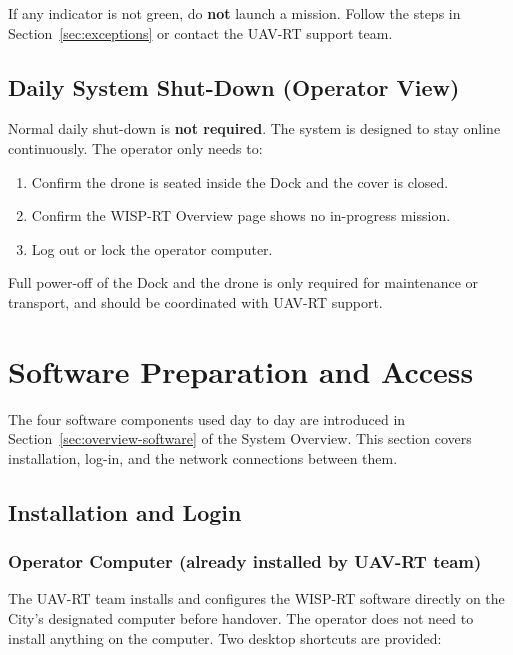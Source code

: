 \documentclass[11pt,letterpaper]{article}
\begin{document}
If any indicator is not green, do \textbf{not} launch a mission. Follow the
steps in Section~\ref{sec:exceptions} or contact the UAV-RT support team.

\subsection{Daily System Shut-Down (Operator View)}

Normal daily shut-down is \textbf{not required}. The system is designed to
stay online continuously. The operator only needs to:

\begin{enumerate}[leftmargin=1.5em]
  \item Confirm the drone is seated inside the Dock and the cover is closed.
  \item Confirm the WISP-RT Overview page shows no in-progress mission.
  \item Log out or lock the operator computer.
\end{enumerate}

Full power-off of the Dock and the drone is only required for maintenance
or transport, and should be coordinated with UAV-RT support.

\newpage
\section{Software Preparation and Access}

The four software components used day to day are introduced in
Section~\ref{sec:overview-software} of the System Overview. This section
covers installation, log-in, and the network connections between them.

\subsection{Installation and Login}

\subsubsection{Operator Computer (already installed by UAV-RT team)}

The UAV-RT team installs and configures the WISP-RT software directly on the
City's designated computer before handover. The operator does not need to
install anything on the computer. Two desktop shortcuts are provided:
\end{document}
